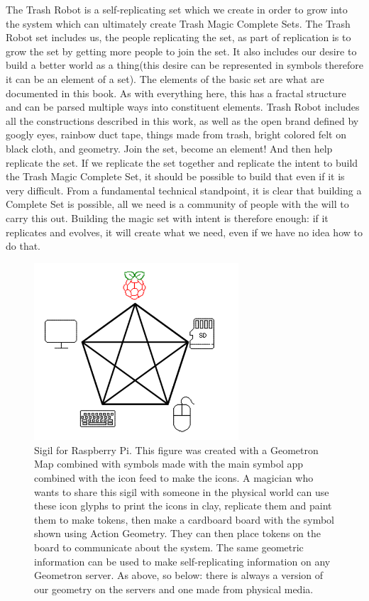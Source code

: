 The Trash Robot is a self-replicating set which we create in order to grow into the system which can ultimately create Trash Magic Complete Sets.  The Trash Robot set includes us, the people replicating the set, as part of replication is to grow the set by getting more people to join the set.  It also includes our desire to build a better world as a thing(this desire can be represented in symbols therefore it can be an element of a set).  The elements of the basic set are what are documented in this book.  As with everything here, this has a fractal structure and can be parsed multiple ways into constituent elements.  Trash Robot includes all the constructions described in this work, as well as the open brand defined by googly eyes, rainbow duct tape, things made from trash, bright colored felt on black cloth, and geometry.  Join the set, become an element!  And then help replicate the set.  If we replicate the set together and replicate the intent to build the Trash Magic Complete Set, it should be possible to build that even if it is very difficult.  From a fundamental technical standpoint, it is clear that building a Complete Set is possible, all we need is a community of people with the will to carry this out.  Building the magic set with intent is therefore enough: if it replicates and evolves, it will create what we need, even if we have no idea how to do that.



\begin{figure}
	\centering
	\includegraphics[width=3in]{figures/magic/pisigil.png}
	\caption[pisigil]
	{Sigil for Raspberry Pi.  This figure was created with a Geometron Map combined with symbols made with the main symbol app combined with the icon feed to make the icons.  A magician who wants to share this sigil with someone in the physical world can use these icon glyphs to print the icons in clay, replicate them and paint them to make tokens, then make a cardboard board with the symbol shown using Action Geometry.  They can then place tokens on the board to communicate about the system.  The same geometric information can be used to make self-replicating information on any Geometron server.  As above, so below: there is always a version of our geometry on the servers and one made from physical media.}
\end{figure}


